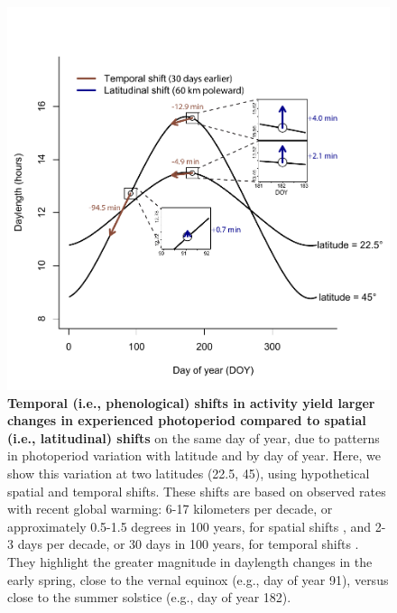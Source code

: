 \documentclass{article}
\begin{document}
\begin{figure}[p]
\centering
\includegraphics{..//..//analyses/photoperiod/figures/photo_spacetime_v2a.pdf} %
\caption{\textbf{Temporal (i.e., phenological) shifts in activity yield larger changes in experienced photoperiod compared to spatial (i.e., latitudinal) shifts} on the same day of year, due to patterns in photoperiod variation with latitude and by day of year. Here, we show this variation at two latitudes (22.5\degree, 45\degree), using hypothetical spatial and temporal shifts. These shifts are based on observed rates with recent global warming: 6-17 kilometers per decade, or approximately 0.5-1.5 degrees in 100 years, for spatial shifts \citep{parmesan2003,parmesan2006}, and 2-3 days per decade, or 30 days in 100 years, for temporal shifts \citep{parmesan2006,chen2011}. They highlight the greater magnitude in daylength changes in the early spring, close to the vernal equinox (e.g., day of year 91), versus close to the summer solstice (e.g., day of year 182).}
 \label{fig:spacetime}%
 \end{figure}
 
\end{document}
